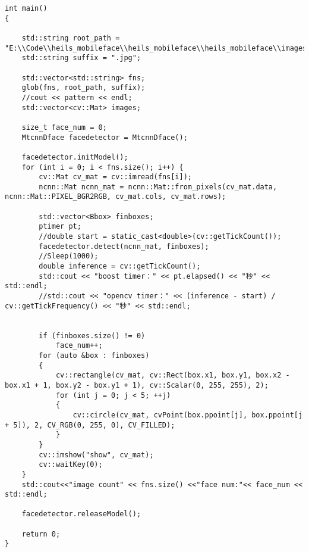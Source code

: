 {\fontsize{10pt}{0.5\baselineskip}\selectfont
	\begin{lstlisting}[caption={空时~LMS~算法~Verilog~模块端口声明},label={code_appB_lms}]
int main()
{

	std::string root_path = "E:\\Code\\heils_mobileface\\heils_mobileface\\heils_mobileface\\images\\lack";
	std::string suffix = ".jpg";
	
	std::vector<std::string> fns;
	glob(fns, root_path, suffix);
	//cout << pattern << endl;
	std::vector<cv::Mat> images;

	size_t face_num = 0;
	MtcnnDface facedetector = MtcnnDface();

	facedetector.initModel();
	for (int i = 0; i < fns.size(); i++) {
		cv::Mat cv_mat = cv::imread(fns[i]);
		ncnn::Mat ncnn_mat = ncnn::Mat::from_pixels(cv_mat.data, ncnn::Mat::PIXEL_BGR2RGB, cv_mat.cols, cv_mat.rows);

		std::vector<Bbox> finboxes;
		ptimer pt;
		//double start = static_cast<double>(cv::getTickCount());
		facedetector.detect(ncnn_mat, finboxes);
		//Sleep(1000);
		double inference = cv::getTickCount();
		std::cout << "boost timer：" << pt.elapsed() << "秒" << std::endl;
		//std::cout << "opencv timer：" << (inference - start) / cv::getTickFrequency() << "秒" << std::endl;
		

		if (finboxes.size() != 0)
			face_num++;
		for (auto &box : finboxes)
		{
			cv::rectangle(cv_mat, cv::Rect(box.x1, box.y1, box.x2 - box.x1 + 1, box.y2 - box.y1 + 1), cv::Scalar(0, 255, 255), 2);
			for (int j = 0; j < 5; ++j)
			{
				cv::circle(cv_mat, cvPoint(box.ppoint[j], box.ppoint[j + 5]), 2, CV_RGB(0, 255, 0), CV_FILLED);
			}
		}
		cv::imshow("show", cv_mat);
		cv::waitKey(0);
	}
	std::cout<<"image count" << fns.size() <<"face num:"<< face_num << std::endl;
	
  	facedetector.releaseModel();
	
	return 0;
}

	\end{lstlisting}
}

\clearpage{\pagestyle{empty}\cleardoublepage}
